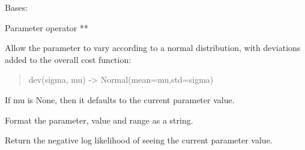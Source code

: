 \documentclass[letterpaper,10pt,english]{sphinxmanual}
\begin{document}
\begin{fulllineitems}
\label{api/mystic.parameter:refl1d.mystic.parameter.OperatorPow}
Bases: {\hyperref[api/mystic.parameter:refl1d.mystic.parameter.BaseParameter]{}}

Parameter operator **

\begin{fulllineitems}
\label{api/mystic.parameter:refl1d.mystic.parameter.OperatorPow.dev}
Allow the parameter to vary according to a normal distribution, with
deviations added to the overall cost function:
\begin{quote}

dev(sigma, mu) -\textgreater{} Normal(mean=mu,std=sigma)
\end{quote}

If mu is None, then it defaults to the current parameter value.

\end{fulllineitems}


\begin{fulllineitems}
\label{api/mystic.parameter:refl1d.mystic.parameter.OperatorPow.dvalue}
\end{fulllineitems}


\begin{fulllineitems}
\label{api/mystic.parameter:refl1d.mystic.parameter.OperatorPow.format}
Format the parameter, value and range as a string.

\end{fulllineitems}


\begin{fulllineitems}
\label{api/mystic.parameter:refl1d.mystic.parameter.OperatorPow.nllf}
Return the negative log likelihood of seeing the current parameter value.

\end{fulllineitems}


\end{fulllineitems}
\end{document}
